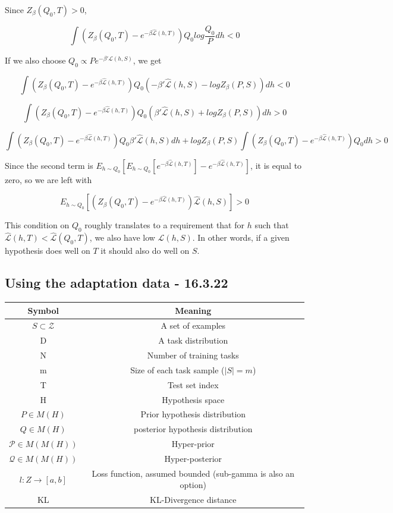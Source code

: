 \documentclass[letterpaper]{article}
\theoremstyle{definition}
\begin{document}
Since $Z_{\beta}(Q_0,T)>0$,

$$\int \left (Z_{\beta}(Q_0,T)-e^{-\beta\hat{\mathcal{L}}(h,T)}\right )Q_0log\frac{Q_0}{P}dh<0$$

If we also choose $Q_0\propto P e^{-\beta' \hat{\mathcal{L}}(h,S)}$, we get

$$\int \left (Z_{\beta}(Q_0,T)-e^{-\beta\hat{\mathcal{L}}(h,T)}\right )Q_0\left (-\beta'\hat{\mathcal{L}}(h,S)-logZ_{\beta}(P,S)\right )dh<0$$

$$\int \left (Z_{\beta}(Q_0,T)-e^{-\beta\hat{\mathcal{L}}(h,T)}\right )Q_0\left (\beta'\hat{\mathcal{L}}(h,S)+logZ_{\beta}(P,S)\right )dh>0$$

$$\int \left (Z_{\beta}(Q_0,T)-e^{-\beta\hat{\mathcal{L}}(h,T)}\right )Q_0 \beta'\hat{\mathcal{L}}(h,S)dh+logZ_{\beta}(P,S)\int \left (Z_{\beta}(Q_0,T)-e^{-\beta\hat{\mathcal{L}}(h,T)}\right )Q_0dh>0$$

Since the second term is $E_{h\sim Q_0}[E_{h\sim Q_0}[e^{-\beta\hat{\mathcal{L}}(h,T)}]-e^{-\beta\hat{\mathcal{L}}(h,T)}]$, it is equal to zero, so we are left with

$$E_{h\sim Q_0}\left [\left (Z_{\beta}(Q_0,T)-e^{-\beta\hat{\mathcal{L}}(h,T)}\right ) \hat{\mathcal{L}}(h,S)\right ]>0$$

This condition on $Q_0$ roughly translates to a requirement that for $h$ such that $\hat{\mathcal{L}}(h,T)<\hat{\mathcal{L}}(Q_0,T)$, we also have low $\hat{\mathcal{L}}(h,S)$.
In other words, if a given hypothesis does well on $T$ it should also do well on $S$.

\subsection{Using the adaptation data - 16.3.22}

\begin{tabular} {|c | c|}
	\hline
	Symbol & Meaning \\
	\hline
	$S\subset \mathcal{Z}$ & A set of examples \\
	D & A task distribution\\
	N & Number of training tasks \\
	m & Size of each task sample ($|S|=m$)\\
	T & Test set index \\
	H & Hypothesis space \\
	$P\in M(H)$ & Prior hypothesis distribution \\
	$Q\in M(H)$ & posterior hypothesis distribution \\
	$\mathcal{P} \in M(M(H))$ & Hyper-prior \\
	$\mathcal{Q} \in M(M(H))$ & Hyper-posterior \\
	$l:Z\rightarrow [a,b] $ & Loss function, assumed bounded (sub-gamma is also an option) \\
	KL & KL-Divergence distance\\
	\hline
\end{tabular}
\end{document}
